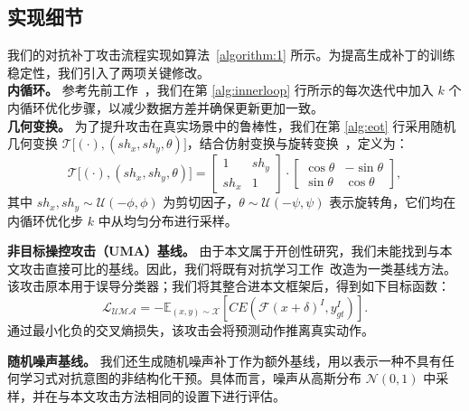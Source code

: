 \subsection{实现细节} \label{Attack_Pipeline}
我们的对抗补丁攻击流程实现如算法~\ref{algorithm:1} 所示。为提高生成补丁的训练稳定性，我们引入了两项关键修改。 \\
\textbf{内循环。} 参考先前工作~\cite{Madry2018twords}，我们在第 \ref{alg:innerloop} 行所示的每次迭代中加入 $k$ 个内循环优化步骤，以减少数据方差并确保更新更加一致。 \\
\textbf{几何变换。} 为了提升攻击在真实场景中的鲁棒性，我们在第 \ref{alg:eot} 行采用随机几何变换 $\mathcal{T}\big[(\cdot),(sh_x,sh_y,\theta)\big]$，结合仿射变换与旋转变换~\cite{AthalyeEOT2018}，定义为：
\begin{equation}
    \mathcal{T}\big[(\cdot),(sh_x,sh_y,\theta)\big]=
    \begin{bmatrix}
    1 & sh_y \\
    sh_x  & 1
    \end{bmatrix}
    \cdot
    \begin{bmatrix}
    \cos \theta & -\sin \theta \\
    \sin \theta & \cos \theta
    \end{bmatrix},
    \label{eq:trans}
\end{equation}
其中 $sh_x, sh_y \sim \mathcal{U}(-\phi, \phi)$ 为剪切因子，$\theta \sim \mathcal{U}(-\psi, \psi)$ 表示旋转角，它们均在内循环优化步 $k$ 中从均匀分布进行采样。

\textbf{非目标操控攻击（UMA）基线。} 
由于本文属于开创性研究，我们未能找到与本文攻击直接可比的基线。因此，我们将既有对抗学习工作~\cite{Florian2020untarget}改造为一类基线方法。该攻击原本用于误导分类器；我们将其整合进本文框架后，得到如下目标函数：
\begin{equation}
\mathcal{L_\text{UMA}}=-\mathbb{E}_{(x,y)\sim\mathcal{X}}[CE(\mathcal{F}(x + \delta)^I, y^I_{gt})].
\end{equation}
通过最小化负的交叉熵损失，该攻击会将预测动作推离真实动作。

\textbf{随机噪声基线。} 我们还生成随机噪声补丁作为额外基线，用以表示一种不具有任何学习式对抗意图的非结构化干预。具体而言，噪声从高斯分布 $\mathcal{N}(0, 1)$ 中采样，并在与本文攻击方法相同的设置下进行评估。

